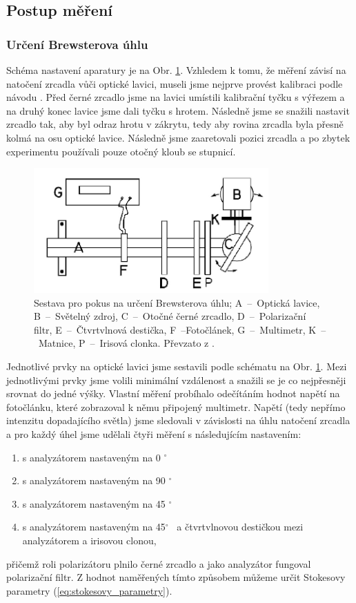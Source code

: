 \documentclass[english]{article}
\begin{document}
	\subsection{Postup měření}
		\subsubsection{Určení Brewsterova úhlu}
			Schéma nastavení aparatury je na Obr. \ref{fig:brewsteruv_uhel}. Vzhledem k tomu, že měření závisí na natočení zrcadla vůči optické lavici, museli jsme nejprve provést kalibraci podle návodu \cite{bib:zadani}. Před černé zrcadlo jsme na lavici umístili kalibrační tyčku s výřezem a na druhý konec lavice jsme dali tyčku s hrotem. Následně jsme se snažili nastavit zrcadlo tak, aby byl odraz hrotu v zákrytu, tedy aby rovina zrcadla byla přesně kolmá na osu optické lavice. Následně jsme zaaretovali pozici zrcadla a po zbytek experimentu používali pouze otočný kloub se stupnicí.

			\begin{figure}[h!]
			\centering
			\includegraphics[width=9cm]{att/brewsteruv_uhel.pdf}
			\caption{Sestava pro pokus na určení Brewsterova úhlu; A~--~Optická lavice, B~--~Světelný zdroj, C~--~Otočné černé zrcadlo, D~--~Polarizační filtr, E~--~Čtvrtvlnová destička, F~--Fotočlánek, G~--~Multimetr, K~--~Matnice, P~--~Irisová clonka. Převzato z \cite{bib:zadani}.}
			\label{fig:brewsteruv_uhel}
			\end{figure}

			Jednotlivé prvky na optické lavici jsme sestavili podle schématu na Obr. \ref{fig:brewsteruv_uhel}. Mezi jednotlivými prvky jsme volili minimální vzdálenost a snažili se je co nejpřesněji srovnat do jedné výšky. Vlastní měření probíhalo odečítáním hodnot napětí na fotočlánku, které zobrazoval k němu připojený multimetr. Napětí (tedy nepřímo intenzitu dopadajícího světla) jsme sledovali v závislosti na úhlu natočení zrcadla a pro každý úhel jsme udělali čtyři měření s následujícím nastavením:
			\begin{enumerate}
			\item s analyzátorem nastaveným na 0 $^\circ$
			\item s analyzátorem nastaveným na 90 $^\circ$
			\item s analyzátorem nastaveným na 45 $^\circ$
			\item s analyzátorem nastaveným na 45$^\circ$ \ a čtvrtvlnovou destičkou mezi analyzátorem a irisovou clonou,
			\end{enumerate}
			přičemž roli polarizátoru plnilo černé zrcadlo a jako analyzátor fungoval polarizační filtr. Z hodnot naměřených tímto způsobem můžeme určit Stokesovy parametry (\ref{eq:stokesovy_parametry}).
\end{document}
